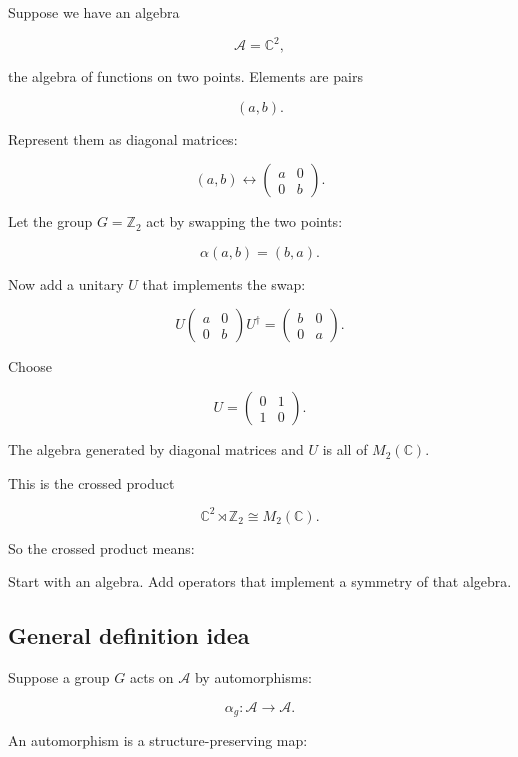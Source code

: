 \documentclass[11pt,a4paper]{article}
\newenvironment{qiqtquote}{\begin{mdframed}[style=quotestyle]}{\end{mdframed}}
\begin{document}
Suppose we have an algebra

\[
\mathcal{A}=\mathbb{C}^2,
\]

the algebra of functions on two points. Elements are pairs

\[
(a,b).
\]

Represent them as diagonal matrices:

\[
(a,b)\leftrightarrow
\begin{pmatrix}
a&0\\
0&b
\end{pmatrix}.
\]

Let the group $G=\mathbb{Z}_2$ act by swapping the two points:

\[
\alpha(a,b)=(b,a).
\]

Now add a unitary $U$ that implements the swap:

\[
U
\begin{pmatrix}
a&0\\
0&b
\end{pmatrix}
U^\dagger
=
\begin{pmatrix}
b&0\\
0&a
\end{pmatrix}.
\]

Choose

\[
U=
\begin{pmatrix}
0&1\\
1&0
\end{pmatrix}.
\]

The algebra generated by diagonal matrices and $U$ is all of $M_2(\mathbb{C})$.

This is the crossed product

\[
\mathbb{C}^2\rtimes \mathbb{Z}_2
\cong
M_2(\mathbb{C}).
\]

So the crossed product means:

\begin{qiqtquote}
Start with an algebra. Add operators that implement a symmetry of that algebra.
\end{qiqtquote}

\subsection{General definition idea}

Suppose a group $G$ acts on $\mathcal{A}$ by automorphisms:

\[
\alpha_g:\mathcal{A}\to\mathcal{A}.
\]

An automorphism is a structure-preserving map:
\end{document}
